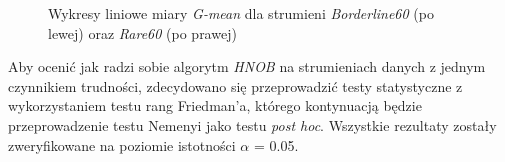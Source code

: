 \newpage

\begin{figure}[h]
    \centering
    \qquad
    \caption{Wykresy liniowe miary \textit{G-mean} dla strumieni \textit{Borderline60} (po lewej) oraz \textit{Rare60} (po prawej)}\label{Figure:BorderlineRareHNOB}
\end{figure}

\noindent Aby ocenić jak radzi sobie algorytm \textit{HNOB} na strumieniach danych z jednym czynnikiem trudności, zdecydowano się przeprowadzić testy statystyczne z wykorzystaniem testu rang Friedman'a, którego kontynuacją będzie przeprowadzenie testu Nemenyi jako testu \textit{post hoc}. Wszystkie rezultaty zostały zweryfikowane na poziomie istotności $\alpha$ = 0.05.

